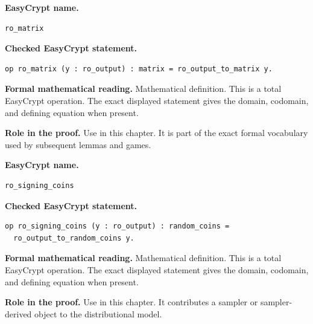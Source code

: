 \begin{formaldefinition}
\noindent\textbf{EasyCrypt name.}
\begin{lstlisting}[language=EasyCrypt,basicstyle=\ttfamily\scriptsize]
ro_matrix
\end{lstlisting}
\noindent\textbf{Checked EasyCrypt statement.}
\begin{lstlisting}[language=EasyCrypt,basicstyle=\ttfamily\scriptsize]
op ro_matrix (y : ro_output) : matrix = ro_output_to_matrix y.
\end{lstlisting}
\noindent\textbf{Formal mathematical reading.}
Mathematical definition. This is a total EasyCrypt operation.  The exact displayed statement gives the domain, codomain, and defining equation when present.

\noindent\textbf{Role in the proof.}
Use in this chapter. It is part of the exact formal vocabulary used by subsequent lemmas and games.

\end{formaldefinition}

\begin{formaldefinition}
\noindent\textbf{EasyCrypt name.}
\begin{lstlisting}[language=EasyCrypt,basicstyle=\ttfamily\scriptsize]
ro_signing_coins
\end{lstlisting}
\noindent\textbf{Checked EasyCrypt statement.}
\begin{lstlisting}[language=EasyCrypt,basicstyle=\ttfamily\scriptsize]
op ro_signing_coins (y : ro_output) : random_coins =
  ro_output_to_random_coins y.
\end{lstlisting}
\noindent\textbf{Formal mathematical reading.}
Mathematical definition. This is a total EasyCrypt operation.  The exact displayed statement gives the domain, codomain, and defining equation when present.

\noindent\textbf{Role in the proof.}
Use in this chapter. It contributes a sampler or sampler-derived object to the distributional model.

\end{formaldefinition}

